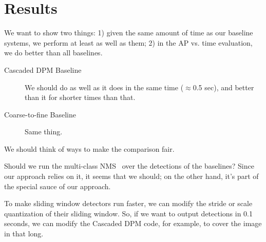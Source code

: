 \section{Results}

We want to show two things: 1) given the same amount of time as our baseline systems, we perform at least as well as them; 2) in the AP vs. time evaluation, we do better than all baselines.

\begin{description}
  \item[Cascaded DPM Baseline~\cite{Felzenszwalb2010b}] We should do as well as it does in the same time ($\approx$0.5 sec), and better than it for shorter times than that.
  \item[Coarse-to-fine Baseline~\cite{Pedersoli2011}] Same thing.
\end{description}

We should think of ways to make the comparison fair.

Should we run the multi-class NMS~\cite{Desai2009} over the detections of the baselines?
Since our approach relies on it, it seems that we should; on the other hand, it's part of the special sauce of our approach.

To make sliding window detectors run faster, we can modify the stride or scale quantization of their sliding window.
So, if we want to output detections in 0.1 seconds, we can modify the Cascaded DPM code, for example, to cover the image in that long.